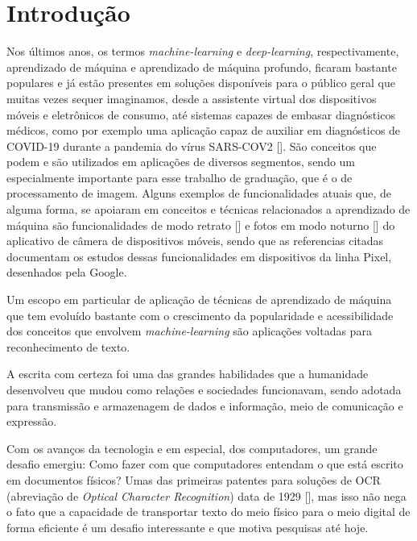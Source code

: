 
\chapter[Introdução]{Introdução}

Nos últimos anos, os termos \textit{machine-learning} e \textit{deep-learning}, respectivamente, aprendizado de máquina e aprendizado de máquina profundo, ficaram bastante populares e já estão presentes em soluções disponíveis para o público geral que muitas vezes sequer imaginamos, desde a assistente virtual dos dispositivos móveis e eletrônicos de consumo, até sistemas capazes de embasar diagnósticos médicos, como por exemplo uma aplicação capaz de auxiliar em diagnósticos de COVID-19 durante a pandemia do vírus SARS-COV2 []. São conceitos que podem e são utilizados em aplicações de diversos segmentos, sendo um especialmente importante para esse trabalho de graduação, que é o de processamento de imagem. Alguns exemplos de funcionalidades atuais que, de alguma forma, se apoiaram em conceitos e técnicas relacionados a aprendizado de máquina são funcionalidades de modo retrato [] e fotos em modo noturno [] do aplicativo de câmera de dispositivos móveis, sendo que as referencias citadas documentam os estudos dessas funcionalidades em dispositivos da linha Pixel, 
desenhados pela Google.

Um escopo em particular de aplicação de técnicas de aprendizado de máquina que tem evoluído bastante com o crescimento da popularidade e acessibilidade dos conceitos que envolvem \textit{machine-learning} são aplicações voltadas para reconhecimento de texto. 

A escrita com certeza foi uma das grandes habilidades que a humanidade desenvolveu que mudou como relações e sociedades funcionavam, sendo adotada para transmissão e armazenagem de dados e informação, meio de comunicação e expressão.

Com os avanços da tecnologia e em especial, dos computadores, um grande desafio emergiu: Como fazer com que computadores entendam o que está escrito em documentos físicos? Umas das primeiras patentes para soluções de OCR (abreviação de \textit{Optical Character Recognition}) data de 1929 [], mas isso não nega o fato que a capacidade de transportar texto do meio físico para o meio digital de forma eficiente é um desafio interessante e que motiva pesquisas até hoje.

